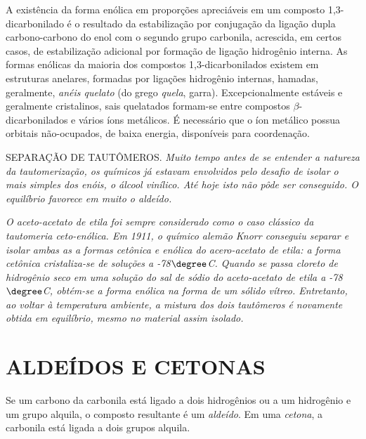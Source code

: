 \noindent A existência da forma enólica em proporções apreciáveis em um composto 1,3-dicarbonilado é o resultado da estabilização por conjugação da ligação dupla carbono-carbono do enol com o segundo grupo carbonila, acrescida, em certos casos, de estabilização adicional por formação de ligação hidrogênio interna. As formas enólicas da maioria dos compostos 1,3-dicarbonilados existem em estruturas anelares, formadas por ligações hidrogênio internas, hamadas, geralmente, \textit{anéis quelato} (do grego \textit{quela}, garra). Excepcionalmente estáveis e geralmente cristalinos, sais quelatados formam-se entre compostos $\beta$-dicarbonilados e vários íons metálicos. É necessário que o íon metálico possua orbitais não-ocupados, de baixa energia, disponíveis para coordenação. 

\begin{tightcenter}
    \chemnameinit{}
    \qquad\qquad
\end{tightcenter}

\par\bigskip
\noindent SEPARAÇÃO DE TAUTÔMEROS. \textit{Muito tempo antes de se entender a natureza da tautomerização, os químicos já estavam envolvidos pelo desafio de isolar o mais simples dos enóis, o álcool vinílico. Até hoje isto não pôde ser conseguido. O equilíbrio favorece em muito o aldeído.}

\textit{O aceto-acetato de etila foi sempre considerado como o caso clássico da tautomeria ceto-enólica. Em 1911, o químico alemão Knorr conseguiu separar e isolar ambas as a formas cetônica e enólica do acero-acetato de etila: a forma cetônica cristaliza-se de soluções a -78$\degree$C. Quando se passa cloreto de hidrogênio seco em uma solução do sal de sódio do aceto-acetato de etila a -78$\degree$C, obtém-se a forma enólica na forma de um sólido vítreo. Entretanto, ao voltar à temperatura ambiente, a mistura dos dois tautômeros é novamente obtida em equilíbrio, mesmo no material assim isolado.}

\section{ALDEÍDOS E CETONAS}

Se um carbono da carbonila está ligado a dois hidrogênios ou a um hidrogênio e um grupo alquila, o composto resultante é um \textit{aldeído}. Em uma \textit{cetona}, a carbonila está ligada a dois grupos alquila.


